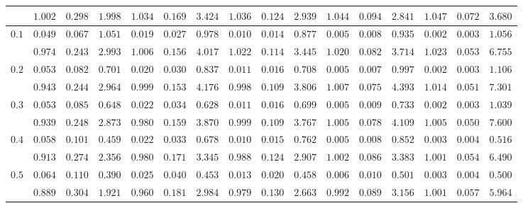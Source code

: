 \begin{table}[ht]
\begin{center}
\begin{tabular}{|c|ccc|ccc|ccc|ccc|ccc|}
 & $ 1.002 $ & $ 0.298 $ & $ 1.998 $ & $ 1.034 $ & $ 0.169 $ & $ 3.424 $ & $ 1.036 $ & $ 0.124 $ & $ 2.939 $ & $ 1.044 $ & $ 0.094 $ & $ 2.841 $ & $ 1.047 $ & $ 0.072 $ & $ 3.680 $\\ 
\hline 
$0.1$ & $ 0.049 $ & $ 0.067 $ & $ 1.051 $ & $ 0.019 $ & $ 0.027 $ & $ 0.978 $ & $ 0.010 $ & $ 0.014 $ & $ 0.877 $ & $ 0.005 $ & $ 0.008 $ & $ 0.935 $ & $ 0.002 $ & $ 0.003 $ & $ 1.056 $\\ 
 & $ 0.974 $ & $ 0.243 $ & $ 2.993 $ & $ 1.006 $ & $ 0.156 $ & $ 4.017 $ & $ 1.022 $ & $ 0.114 $ & $ 3.445 $ & $ 1.020 $ & $ 0.082 $ & $ 3.714 $ & $ 1.023 $ & $ 0.053 $ & $ 6.755 $\\ 
\hline 
$0.2$ & $ 0.053 $ & $ 0.082 $ & $ 0.701 $ & $ 0.020 $ & $ 0.030 $ & $ 0.837 $ & $ 0.011 $ & $ 0.016 $ & $ 0.708 $ & $ 0.005 $ & $ 0.007 $ & $ 0.997 $ & $ 0.002 $ & $ 0.003 $ & $ 1.106 $\\ 
 & $ 0.943 $ & $ 0.244 $ & $ 2.964 $ & $ 0.999 $ & $ 0.153 $ & $ 4.176 $ & $ 0.998 $ & $ 0.109 $ & $ 3.806 $ & $ 1.007 $ & $ 0.075 $ & $ 4.393 $ & $ 1.014 $ & $ 0.051 $ & $ 7.301 $\\ 
\hline 
$0.3$ & $ 0.053 $ & $ 0.085 $ & $ 0.648 $ & $ 0.022 $ & $ 0.034 $ & $ 0.628 $ & $ 0.011 $ & $ 0.016 $ & $ 0.699 $ & $ 0.005 $ & $ 0.009 $ & $ 0.733 $ & $ 0.002 $ & $ 0.003 $ & $ 1.039 $\\ 
 & $ 0.939 $ & $ 0.248 $ & $ 2.873 $ & $ 0.980 $ & $ 0.159 $ & $ 3.870 $ & $ 0.999 $ & $ 0.109 $ & $ 3.767 $ & $ 1.005 $ & $ 0.078 $ & $ 4.109 $ & $ 1.005 $ & $ 0.050 $ & $ 7.600 $\\ 
\hline 
$0.4$ & $ 0.058 $ & $ 0.101 $ & $ 0.459 $ & $ 0.022 $ & $ 0.033 $ & $ 0.678 $ & $ 0.010 $ & $ 0.015 $ & $ 0.762 $ & $ 0.005 $ & $ 0.008 $ & $ 0.852 $ & $ 0.003 $ & $ 0.004 $ & $ 0.516 $\\ 
 & $ 0.913 $ & $ 0.274 $ & $ 2.356 $ & $ 0.980 $ & $ 0.171 $ & $ 3.345 $ & $ 0.988 $ & $ 0.124 $ & $ 2.907 $ & $ 1.002 $ & $ 0.086 $ & $ 3.383 $ & $ 1.001 $ & $ 0.054 $ & $ 6.490 $\\ 
\hline 
$0.5$ & $ 0.064 $ & $ 0.110 $ & $ 0.390 $ & $ 0.025 $ & $ 0.040 $ & $ 0.453 $ & $ 0.013 $ & $ 0.020 $ & $ 0.458 $ & $ 0.006 $ & $ 0.010 $ & $ 0.501 $ & $ 0.003 $ & $ 0.004 $ & $ 0.500 $\\ 
 & $ 0.889 $ & $ 0.304 $ & $ 1.921 $ & $ 0.960 $ & $ 0.181 $ & $ 2.984 $ & $ 0.979 $ & $ 0.130 $ & $ 2.663 $ & $ 0.992 $ & $ 0.089 $ & $ 3.156 $ & $ 1.001 $ & $ 0.057 $ & $ 5.964 $\\ 
\hline 

\end{tabular}
\end{center}
\end{table}

